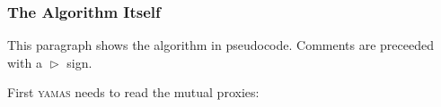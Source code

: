 \subsubsection{The Algorithm Itself}

This paragraph shows the algorithm in pseudocode. Comments are preceeded with a $\vartriangleright$ sign.

First \textsc{yamas} needs to read the mutual proxies:
% 
% 

